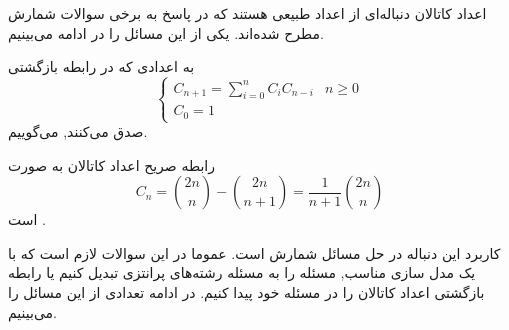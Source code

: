 \p
اعداد کاتالان دنباله‌ای از اعداد طبیعی هستند که در پاسخ به برخی سوالات شمارش مطرح شده‌اند.
یکی از این مسائل را در ادامه می‌بینیم.


\begin{DEFINITION}
    \p
      به اعدادی که در رابطه بازگشتی
    \[\begin{cases}
        C_{n+1}=\sum_{i=0}^n C_iC_{n-i} & n\geq 0 \\
        
        C_0=1
    \end{cases}
    \]
    صدق می‌کنند,
      می‌گوییم.
\end{DEFINITION}


\begin{THEOREM}
  \p
    رابطه صریح اعداد کاتالان به صورت
    \[C_n=\binom{2n}{n}-\binom{2n}{n+1}=\dfrac{1}{n+1}\binom{2n}{n}\]
    است
    .
\end{THEOREM}

 کاربرد این دنباله در حل مسائل شمارش است. عموما در این سوالات لازم است که با یک مدل سازی مناسب, مسئله را به مسئله رشته‌های پرانتزی تبدیل کنیم یا رابطه بازگشتی اعداد کاتالان را در مسئله خود پیدا کنیم. در ادامه تعدادی از این مسائل را می‌بینیم.

